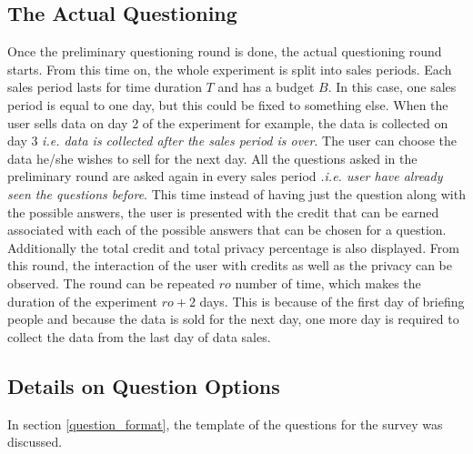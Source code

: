 \subsection{The Actual Questioning}
Once the preliminary questioning round is done, the actual questioning round starts. From this time on, the whole experiment is
split into sales periods. Each sales period lasts for time duration $T$ and has a budget $B$. In this case, one sales period
is equal to one day, but this could be fixed to something else. When the user sells data on day 2 of the experiment for example, the data is collected on day 3 {\it i.e. data is collected after the sales period is over}.
 The user can choose the data he/she
wishes to sell for the next day. All the questions asked in the preliminary round are asked again in every sales period {\it .i.e. user have already seen the questions before}. 
This time instead of having just the question along with the possible answers, the user is presented with
the credit that can be earned associated with each of the possible answers that can be chosen for a question. Additionally the total credit and total privacy percentage is also displayed. From this round,
the interaction of the user with credits as well as the privacy can be observed. The round can be repeated $ro$ number of time, which makes the duration of the experiment
$ro + 2$ days. This is because of the first day of briefing people and because the data is sold for the next day, one more day is required to collect the data from
the last day of data sales.

\subsection{Details on Question Options}
In section \ref{question_format}, the template of the questions for the survey was discussed. 